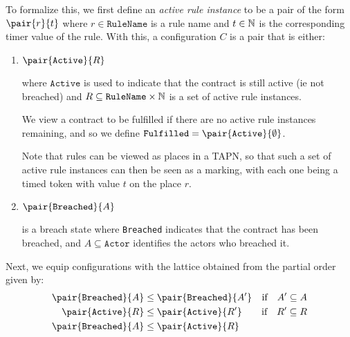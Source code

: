 \documentclass{article}
\begin{document}
To formalize this, we first define an \textit{active rule instance} to be a
pair of the form $\pair{r}{t}$ where $r \in \texttt{RuleName}$ is a rule name
and $t \in \operatorname{\mathbb{N}}$ is the corresponding timer value of the rule.
With this, a configuration $C$ is a pair that is either:

\begin{enumerate}
  \item
  $\pair{\texttt{Active}}{R}$
  
  where $\texttt{Active}$ is used to indicate that the contract is still active
  (ie not breached) and
  $R \subseteq \texttt{RuleName} \times \operatorname{\mathbb{N}}$
  is a set of active rule instances.

  We view a contract to be fulfilled if there are no active rule instances
  remaining, and so we define
  $\texttt{Fulfilled} = \pair{\texttt{Active}}{\emptyset}$.

  Note that rules can be viewed as places in a TAPN, so that such a set of
  active rule instances can then be seen as a marking, with each one being a
  timed token with value $t$ on the place $r$.




  \item
  $\pair{\texttt{Breached}}{A}$

  is a breach state where \texttt{Breached} indicates that the contract has
  been breached, and $A \subseteq \texttt{Actor}$ identifies the actors who
  breached it.
\end{enumerate}

Next, we equip configurations with the lattice obtained from the partial order
given by:
\begin{align*}
    \pair{\texttt{Breached}}{A} & \leq
    \pair{\texttt{Breached}}{A'}
    & \text{if} \quad A' \subseteq A
    \\
    \pair{\texttt{Active}}{R} & \leq
    \pair{\texttt{Active}}{R'}
    & \text{if} \quad R' \subseteq R
    \\ 
    \pair{\texttt{Breached}}{A} & \leq
    \pair{\texttt{Active}}{R}
\end{align*}
\end{document}
